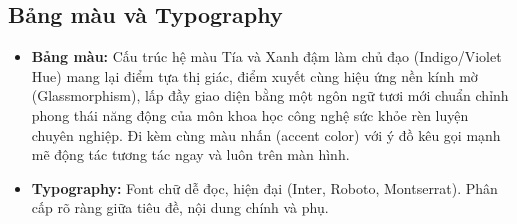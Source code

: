 \subsection{Bảng màu và Typography}
\label{subsec:ui_color_typography_retained}
\begin{itemize}
    \item \textbf{Bảng màu:} Cấu trúc hệ màu Tía và Xanh đậm làm chủ đạo (Indigo/Violet Hue) mang lại điểm tựa thị giác, điểm xuyết cùng hiệu ứng nền kính mờ (Glassmorphism), lấp đầy giao diện bằng một ngôn ngữ tươi mới chuẩn chỉnh phong thái năng động của môn khoa học công nghệ sức khỏe rèn luyện chuyên nghiệp. Đi kèm cùng màu nhấn (accent color) với ý đồ kêu gọi mạnh mẽ động tác tương tác ngay và luôn trên màn hình.
    \item \textbf{Typography:} Font chữ dễ đọc, hiện đại (Inter, Roboto, Montserrat). Phân cấp rõ ràng giữa tiêu đề, nội dung chính và phụ.
\end{itemize}


